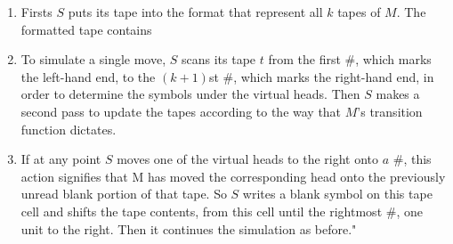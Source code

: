\documentclass[main.tex]{subfiles}
\begin{document}
\begin{enumerate}[label=\textbf{\arabic*}]
    \item Firsts $S$ puts its tape into the format that represent all $k$ tapes of $M$. The formatted tape contains 
    \item To simulate a single move, $S$ scans its tape $t$ from the first \#, which marks the left-hand end, to the $(k+1)$st \#, which marks the right-hand end, in order to determine the symbols under the virtual heads. Then $S$ makes a second pass to update the tapes according to the way that $M$'s transition function dictates. 
    \item If at any point $S$ moves one of the virtual heads to the right onto $a$ \#, this action signifies that M has moved the corresponding head onto the previously unread blank portion of that tape. So $S$ writes a blank symbol on this tape cell and shifts the tape contents, from this cell until the rightmost $\#$, one unit to the right. Then it continues the simulation as before."
\end{enumerate} 
\end{document}
